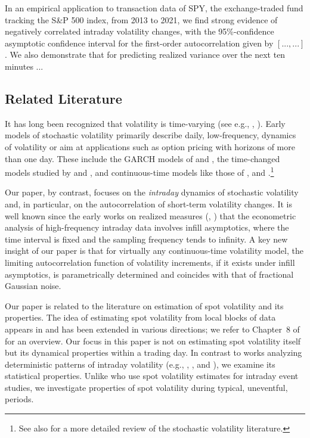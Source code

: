 \documentclass[ecta,nameyear,draft]{econsocart}
\newcommand{\1}{\mathbf 1}
\numberwithin{equation}{section}
\begin{document}
In an empirical application to transaction data of SPY, the exchange-traded fund tracking the S\&P 500 index, from 2013 to 2021, we find strong evidence of negatively correlated intraday volatility changes, with the 95\%-confidence asymptotic confidence interval for the  first-order autocorrelation given by $[...,...]$. We also demonstrate that for predicting realized variance over the next ten minutes ...

\subsection*{Related Literature}

It has long been recognized  that volatility is time-varying (see e.g., \cite{M63}, \cite{F65}). Early models of stochastic volatility   primarily describe daily, low-frequency, dynamics of volatility  or aim at   applications such as option pricing with horizons of more than one day. These include the  GARCH   models of \cite{E82} and \cite{B86}, the time-changed models studied by \cite{C73} and \cite{TP83}, and continuous-time models like those of \cite{CIR85}, \cite{HW87} and  \cite{heston1993closed}.\footnote{See also \cite{SA09} for a more detailed review of the stochastic volatility literature.}

Our paper, by contrast, focuses on the \emph{intraday} dynamics of stochastic volatility and, in particular, on the autocorrelation of short-term volatility changes. It is well known since the early works on realized measures (\cite{Andersen-Bollerslev-Diebold-Labys-2001,ABDL03}, \cite{BNS02}) that the econometric analysis of high-frequency intraday data involves infill asymptotics, where the time interval is fixed and the sampling frequency tends to infinity. A key new insight of our paper is that for virtually any continuous-time volatility model, the limiting autocorrelation function of volatility increments, if it exists under infill asymptotics, is parametrically determined and coincides with that of fractional Gaussian noise. 

Our paper is  related to the literature on estimation  of spot volatility and its   properties. The idea of estimating spot volatility from local blocks of data    appears in \cite{FN96} and has been extended in various directions; we refer to Chapter~8 of \cite{ait2014high} for an overview. Our focus in this paper is not on estimating spot volatility  itself but   its dynamical properties within a trading day. In contrast to works analyzing   deterministic patterns of intraday volatility  (e.g., \cite{WMO85}, \cite{H86}, \cite{BB91} and \cite{ASTZ24}), we examine its statistical properties. Unlike \cite{BLX18, BLL21, BLR24} who use spot volatility estimates for intraday event studies, we investigate  properties of spot volatility during typical, uneventful, periods.
\end{document}
